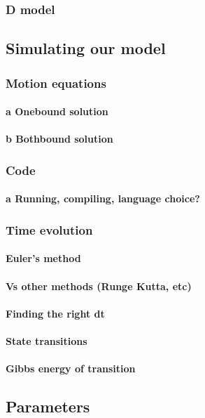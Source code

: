 \documentclass[10pt]{article} %
\begin{document}
		\subsubsection{D model}
	\subsection{Simulating our model}
		\subsubsection{Motion equations}
			\paragraph{a Onebound solution}
			\paragraph{b Bothbound solution}
		\subsubsection{Code}
			\paragraph{a Running, compiling, language choice?}
		\subsubsection{Time evolution}
			\paragraph{Euler’s method}
			\paragraph{Vs other methods (Runge Kutta, etc)}
			\paragraph{Finding the right dt}
			\paragraph{State transitions}
		        \paragraph{Gibbs energy of transition}
		\subsection{Parameters}
\end{document}
